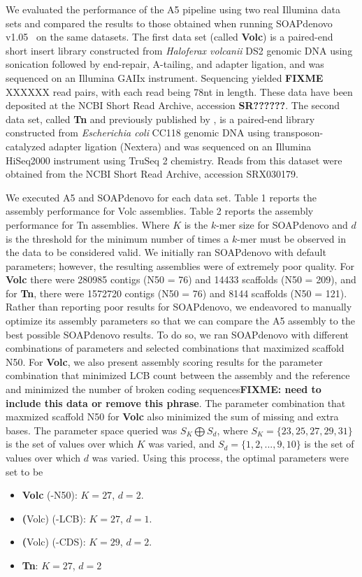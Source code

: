 \documentclass{bioinfo}
\begin{document}
We evaluated the performance of the A5 pipeline using two real Illumina data sets and compared the results to
those obtained when running SOAPdenovo v1.05~\citep{Li2010} on the same datasets. The first data set (called \textbf{Volc}) is a paired-end short insert library constructed from \emph{Haloferax volcanii} DS2 genomic DNA 
using sonication followed by end-repair, A-tailing, and adapter ligation, and was sequenced on an Illumina GAIIx instrument.
Sequencing yielded \textbf{FIXME} XXXXXX read pairs, with each read being 78nt in length. These data have been deposited at the NCBI Short Read Archive, accession \textbf{SR??????}. 
The second data set, called \textbf{Tn} and previously published by \citet{Adey2010}, is a paired-end library constructed from \emph{Escherichia coli} CC118 genomic DNA
using transposon-catalyzed adapter ligation (Nextera) and was sequenced on an Illumina HiSeq2000 instrument using TruSeq 2 chemistry. 
Reads from this dataset were obtained from the NCBI Short Read Archive, accession SRX030179.

We executed A5 and SOAPdenovo for each data set. Table 1 reports the assembly performance for Volc assemblies.
Table 2 reports the assembly performance for Tn assemblies. 
Where $K$ is the $k$-mer size for SOAPdenovo and $d$ is the threshold for the minimum number of times a $k$-mer must be observed in the data to be considered valid.
We initially ran SOAPdenovo with default parameters; however, the resulting assemblies were of extremely poor quality. For \textbf{Volc} there were
280985 contigs (N50 = 76) and 14433 scaffolds (N50 = 209), and for \textbf{Tn}, there were 1572720 contigs (N50 = 76) and 8144 scaffolds (N50 = 121). 
Rather than reporting poor results for SOAPdenovo, we endeavored to manually optimize its assembly parameters so that we can compare the A5 assembly to the best possible SOAPdenovo results. 
To do so, we ran SOAPdenovo with different combinations of parameters and selected combinations that maximized scaffold N50. For \textbf{Volc},
we also present assembly scoring results for the parameter combination that minimized LCB count between the assembly and the reference and minimized
the number of broken coding sequences\textbf{FIXME: need to include this data or remove this phrase}. The parameter combination that maxmized scaffold N50 for \textbf{Volc} also minimized the sum
of missing and extra bases. The parameter space queried was $S_K \bigoplus S_d$,
where $S_K = \{23,25,27,29,31\}$ is the set of values over which $K$ was varied, and $S_d = \{1,2,...,9,10\}$ is the set of values over which $d$
was varied. Using this process, the optimal parameters were set to be
\begin{itemize}
\item \textbf{Volc} (-N50): $K = 27$, $d = 2$.
\item \textbf(Volc) (-LCB): $K = 27$, $d = 1$.
\item \textbf(Volc) (-CDS): $K = 29$, $d = 2$.
\item \textbf{Tn}: $K = 27$, $d = 2$
\end{itemize}
\end{document}
